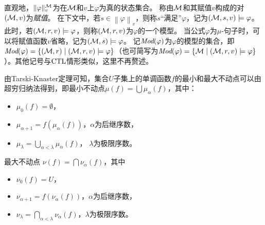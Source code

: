 直观地，$\| \varphi \|_v^{{\cal M}}$为在${\cal M}$和$v$上$\varphi$为真的状态集合。
称由${\cal M}$和其赋值$v$构成的对$({\cal M},v)$为{\em 赋值}。
在下文中，若$s\in \left\| \varphi \right\|_v$，则称$s$“满足”$\varphi$，记为$({\cal M}, s, v) \models \varphi$。
此时，若$({\cal M}, r, v) \models \varphi$，则称$({\cal M}, r, v)$为$\varphi$的一个模型。
当公式$\varphi$为$\mu$-句子时，可以将赋值函数$v$省略，记为$({\cal M}, s) \models \varphi$。
记$\textit{Mod}(\varphi)$为$\varphi$的模型的集合，即$\textit{Mod}(\varphi) = \{({\cal M},r) \mid ({\cal M},r,v) \models \varphi\}$（也可简写为$\textit{Mod}(\varphi) = \{{\cal M}\mid ({\cal M},r,v) \models \varphi\}$）。其他记号与$\textrm{CTL}$情形类似，这里不再赘述。

由Tarski-Knaster定理可知，集合$U$子集上的单调函数$f$的最小和最大不动点可以由超穷归纳法得到，即最小不动点$\mu(f)= \bigcup\mu_{\alpha}(f)$，其中：
\begin{itemize}
	\item $\mu_0(f) = \emptyset$，
	\item $\mu_{\alpha+1} =  f(\mu_{\alpha}(f))$，$\alpha$为后继序数，
	\item $\mu_{\lambda} = \bigcup_{\alpha < \lambda} \mu_{\alpha}(f)$， $\lambda$为极限序数。
\end{itemize}
最大不动点 $\nu(f) = \bigcap\nu_{\alpha}(f)$，其中
\begin{itemize}
	\item $\nu_0(f) = U$，
	\item $\nu_{\alpha+1} =  f(\nu_{\alpha}(f))$，$\alpha$为后继序数，
	\item $\nu_{\lambda} = \bigcap_{\alpha < \lambda} \nu_{\alpha}(f)$，$\lambda$为极限序数。
\end{itemize}

